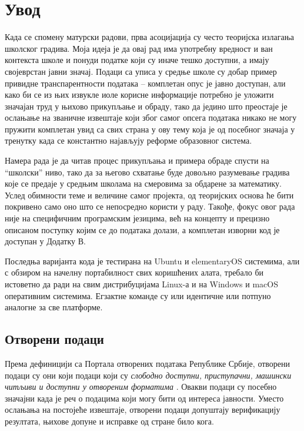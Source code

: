 \chapter{Увод}\label{ch:\thechapter}

Када се спомену матурски радови, прва асоцијација су често теоријска излагања школског градива. Моја идеја је да овај рад има употребну вредност и ван контекста школе и понуди податке који су иначе тешко доступни, а имају својеврстан јавни значај. Подаци са уписа у средње школе су добар пример привидне транспарентности података -- комплетан опус је јавно доступан, али како би се из њих извукле иоле корисне информације потребно је уложити значајан труд у њихово прикупљање и обраду, тако да једино што преостаје је ослањање на званичне извештаје који због самог опсега података никако не могу пружити комплетан увид са свих страна у ову тему која је од посебног значаја у тренутку када се константно најављују реформе образовног система.

Намера рада је да читав процес прикупљања и примера обраде спусти на \enquote{школски} ниво, тако да за његово схватање буде довољно разумевање градива које се предаје у средњим школама на смеровима за обдарене за математику. Услед обимности теме и величине самог пројекта, од теоријских основа ће бити покривено само оно што се непосредно користи у раду. Такође, фокус овог рада није на специфичним програмским језицима, већ на концепту и прецизно описаном поступку којим се до података долази, а комплетан изворни код је доступан у Додатку В.

Последња варијанта кода је тестирана на Ubuntu и elementaryOS системима, али с обзиром на начелну портабилност свих коришћених алата, требало би истоветно да ради на свим дистрибуцијама Linux-а и на Windows и macOS оперативним системима. Егзактне команде су или идентичне или потпуно аналогне за све платформе.

\section{Отворени подаци}

Према дефиницији са Портала отворених података Републике Србије, отворени подаци су они који подаци који су \emph{слободно доступни, приступачни, машински читљиви и доступни у отвореним форматима} \citep{opendatadef}. Овакви подаци су посебно значајни када је реч о подацима који могу бити од интереса јавности. Уместо ослањања на постојеће извештаје, отворени подаци допуштају верификацију резултата, њихове допуне и исправке од стране било кога.


